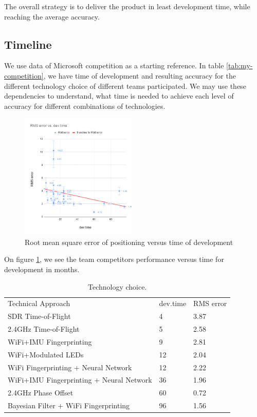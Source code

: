 The overall strategy is to deliver the product in least development time, while reaching the average accuracy.

\subsection{Timeline}

We use data of Microsoft competition as a starting reference. In table \ref{tab:my-competition}, we have time of development and resulting accuracy for the different technology choice of different teams participated.
We may use these dependencies to understand, what time is needed to achieve each level of accuracy for different combinations of technologies.

\begin{figure}
  \includegraphics[width=0.49\textwidth]{img/RMSerrorvsdevtime.png}
  \caption{Root mean square error of positioning versus time of development}
  \label{im:rmse}
\end{figure}

On figure \ref{im:rmse}, we see the team competitors performance versus time for development in months.

\begin{table}[]
\caption{Technology choice.}
\label{tab:best-tech}
\begin{tabular}{lll}
Technical Approach & dev.time & RMS error \\
SDR Time-of-Flight & 4 & 3.87 \\
2.4GHz Time-of-Flight & 5 & 2.58 \\
WiFi+IMU Fingerprinting & 9 & 2.81 \\
WiFi+Modulated LEDs & 12 & 2.04 \\
WiFi Fingerprinting + Neural Network & 12 & 2.22 \\
WiFi+IMU Fingerprinting + Neural Network & 36 & 1.96 \\
2.4GHz Phase Offset & 60 & 0.72 \\
Bayesian Filter + WiFi Fingerprinting & 96 & 1.56
\end{tabular}%
\end{table}

